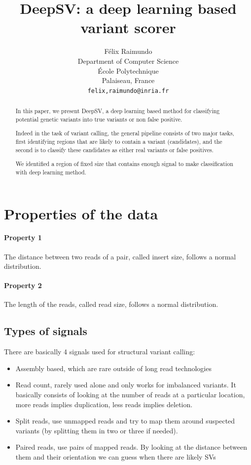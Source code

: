 \documentclass{article}
\title{DeepSV: a deep learning based variant scorer}
\author{
  Félix Raimundo\\
  Department of Computer Science\\
  École Polytechnique\\
  Palaiseau, France\\
  \texttt{felix,raimundo@inria.fr}
}
\begin{document}
\maketitle

\begin{abstract}
  In this paper, we present DeepSV, a deep learning based method for classifying
  potential genetic variants into true variants or non false positive.
  
  Indeed in the task of variant calling, the general pipeline consists of two major tasks,
  first identifying regions that are likely to contain a variant (candidates), and the second
  is to classify these candidates as either real variants or false positives.
  
  We identified a region of fixed size that contains enough signal to make classification
  with deep learning method. 
\end{abstract}

\section{Properties of the data}

\paragraph{Property 1} The distance between two reads of a pair, called insert size, follows a normal distribution.
\paragraph{Property 2} The length of the reads, called read size, follows a normal distribution.


\subsection{Types of signals}

There are basically 4 signals used for structural variant calling:

\begin{itemize}
	\item Assembly based, which are rare outside of long read technologies
	\item Read count, rarely used alone and only works for imbalanced variants. It basically consists
of looking at the number of reads at a particular location, more reads implies duplication, less
reads implies deletion.
	\item Split reads, use unmapped reads and try to map them around suspected variants (by splitting them
in two or three if needed).
	\item Paired reads, use pairs of mapped reads. By looking at the distance between them and their
orientation we can guess when there are likely SVs
\end{itemize}
\end{document}

